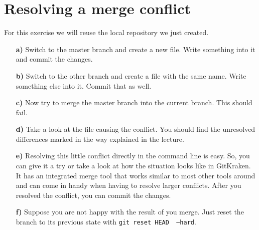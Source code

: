 \documentclass[11pt]{article}
\begin{document}
\section*{Resolving a merge conflict}
For this exercise we will reuse the local repository we just created.

\begin{itemize}
\item[\bf{a)}] Switch to the master branch and create a new file. Write something into it and commit the changes.
\item[\bf{b)}]  Switch to the other branch and create a file with the same name. Write something else into it. Commit that as well.
\item[\bf{c)}] Now try to merge the master branch into the current branch. This should fail.
\item[\bf{d)}] Take a look at the file causing the conflict. You should find the unresolved differences marked in the way explained in the lecture.
\item[\bf{e)}] Resolving this little conflict directly in the command line is easy. So, you can give it a try or take a look at how the situation looks like in GitKraken. It has an integrated merge tool that works similar to most other tools around and can come in handy when having to resolve larger conflicts. After you resolved the conflict, you can commit the changes.
\item[\bf{f)}] Suppose you are not happy with the result of you merge. Just reset the branch to its previous state with \texttt{git reset HEAD~ --hard}.
\end{itemize}
\end{document}
